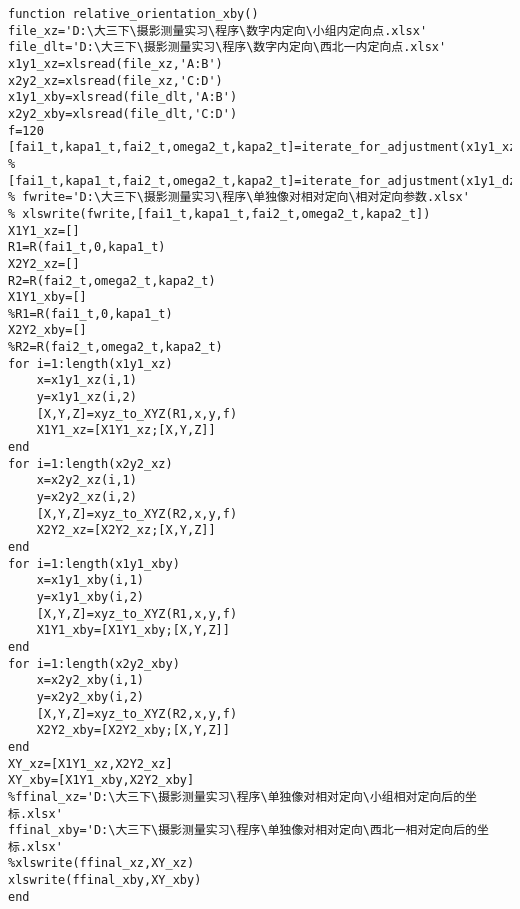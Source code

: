 \begin{lstlisting}[caption=relative\_orientation\_xby.m]
function relative_orientation_xby()
file_xz='D:\大三下\摄影测量实习\程序\数字内定向\小组内定向点.xlsx'
file_dlt='D:\大三下\摄影测量实习\程序\数字内定向\西北一内定向点.xlsx'
x1y1_xz=xlsread(file_xz,'A:B')
x2y2_xz=xlsread(file_xz,'C:D')
x1y1_xby=xlsread(file_dlt,'A:B')
x2y2_xby=xlsread(file_dlt,'C:D')
f=120
[fai1_t,kapa1_t,fai2_t,omega2_t,kapa2_t]=iterate_for_adjustment(x1y1_xz,x2y2_xz,f)
%[fai1_t,kapa1_t,fai2_t,omega2_t,kapa2_t]=iterate_for_adjustment(x1y1_dzj,x2y2_dzj,f)
% fwrite='D:\大三下\摄影测量实习\程序\单独像对相对定向\相对定向参数.xlsx'
% xlswrite(fwrite,[fai1_t,kapa1_t,fai2_t,omega2_t,kapa2_t])
X1Y1_xz=[]
R1=R(fai1_t,0,kapa1_t)
X2Y2_xz=[]
R2=R(fai2_t,omega2_t,kapa2_t)
X1Y1_xby=[]
%R1=R(fai1_t,0,kapa1_t)
X2Y2_xby=[]
%R2=R(fai2_t,omega2_t,kapa2_t)
for i=1:length(x1y1_xz)
    x=x1y1_xz(i,1)
    y=x1y1_xz(i,2)
    [X,Y,Z]=xyz_to_XYZ(R1,x,y,f)
    X1Y1_xz=[X1Y1_xz;[X,Y,Z]]
end
for i=1:length(x2y2_xz)
    x=x2y2_xz(i,1)
    y=x2y2_xz(i,2)
    [X,Y,Z]=xyz_to_XYZ(R2,x,y,f)
    X2Y2_xz=[X2Y2_xz;[X,Y,Z]]
end    
for i=1:length(x1y1_xby)
    x=x1y1_xby(i,1)
    y=x1y1_xby(i,2)
    [X,Y,Z]=xyz_to_XYZ(R1,x,y,f)
    X1Y1_xby=[X1Y1_xby;[X,Y,Z]]
end
for i=1:length(x2y2_xby)
    x=x2y2_xby(i,1)
    y=x2y2_xby(i,2)
    [X,Y,Z]=xyz_to_XYZ(R2,x,y,f)
    X2Y2_xby=[X2Y2_xby;[X,Y,Z]]
end    
XY_xz=[X1Y1_xz,X2Y2_xz]
XY_xby=[X1Y1_xby,X2Y2_xby]
%ffinal_xz='D:\大三下\摄影测量实习\程序\单独像对相对定向\小组相对定向后的坐标.xlsx'
ffinal_xby='D:\大三下\摄影测量实习\程序\单独像对相对定向\西北一相对定向后的坐标.xlsx'
%xlswrite(ffinal_xz,XY_xz)
xlswrite(ffinal_xby,XY_xby)
end
\end{lstlisting}

